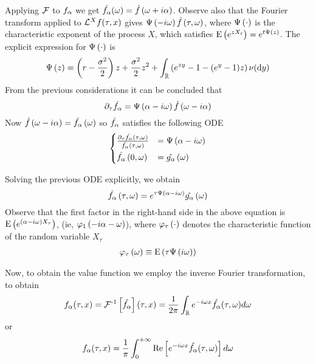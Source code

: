 \documentclass[11pt]{amsart}
\begin{document}
Applying $\operatorname{\mathcal{F}}$ to $f_{\alpha}$ we get $\hat{f_{\alpha}}(\omega)=\hat{f} \left( {\omega + i \alpha} \right)$.
Observe also that the Fourier transform applied to $\mathcal{L}^{X} f(\tau,x)$ gives $\Psi \left( {{-i\omega}} \right)\hat{f} \left( {\tau,\omega} \right)$,
where $\Psi \left( {{\cdot}} \right)$ is the characteristic exponent of the process $X$, which satisfies $\mathrm{E} \left( {{e^{zX_t}}} \right)=e^{t\Psi \left( {{z}} \right)}$.
The explicit expression for $\Psi \left( {{\cdot}} \right)$ is 
\begin{equation}
\label{characteristicDefinition}
\Psi \left( {{z}} \right)
=\left( {r-\frac{\sigma^2}2} \right) z +\frac{\sigma^2}2 z^2 +\int_{\mathbb{R}} \left(e^{z y}-1-(e^{y}-1)z\right)\nu(\textrm{d} y) \\[.5em]
\end{equation}
From the previous considerations it can be concluded that 
\begin{equation}
\partial_{\tau} \hat{f_{\alpha}} = \Psi \left( {{\alpha -i \omega}} \right) \hat{f} \left( {\omega - i \alpha} \right)
\end{equation}
Now $\hat{f}\left( {\omega - i \alpha} \right) = \hat{f_{\alpha}} \left( {\omega} \right)$ so $\hat{f_{\alpha}}$ satisfies the following ODE
\begin{equation}
\begin{cases}
\frac{\partial_{\tau}\hat{f_{\alpha}}\left( {\tau,\omega} \right)}{\hat{f_{\alpha}}(\tau,\omega)}&=\Psi \left( {{\alpha -i \omega}} \right)\\[.5em]
\hat{f_{\alpha}} \left( {0,\omega} \right)&=\hat{g_{\alpha}}\left( {\omega} \right)
\end{cases}
\end{equation}

Solving the previous ODE explicitly, we obtain
\begin{equation}
\hat{f_{\alpha}} \left( {\tau,\omega} \right)
= e^{\tau \Psi \left( {{\alpha-i \omega}} \right) } \hat{g_{\alpha}} \left( {\omega} \right)
\label{eq:theODE}
\end{equation}
Observe that the first factor in the right-hand side in the above 
equation is $\mathrm{E} \left( {{e^{\left( {\alpha-i \omega} \right)X_{\tau}}}} \right)$, (ie, $\varphi_{1} \left( {{-i\alpha-\omega}} \right)$), where $\varphi_{\tau} \left( {{\cdot}} \right)$ denotes the characteristic function of the
random variable $X_{\tau}$
\begin{align}
\varphi_{\tau} \left( {{\omega}} \right) \equiv \mathrm{E} \left( {{\tau \Psi \left( {{i \omega}} \right)}} \right) 
\end{align}

Now, to obtain the value function we employ
the inverse Fourier transformation, to obtain
\begin{equation}
f_{\alpha}(\tau,x)=\operatorname{\mathcal{F}^{-1}}\left[\hat{f_{\alpha}}\right](\tau,x)=\frac{1}{2\pi}\int_{\mathbb{R}} e^{-i\omega x} \hat{f_{\alpha}}(\tau,\omega)d\omega
\label{eq:fadefinition}
\end{equation}
or
\begin{equation}
f_{\alpha}(\tau,x)=\frac{1}{\pi}\int_{0}^{+\infty} \mathrm{Re}\left[e^{-i\omega x} \hat{f_{\alpha}}(\tau,\omega)\right]d\omega
\label{eq:fadefinition2}
\end{equation}
\end{document}
